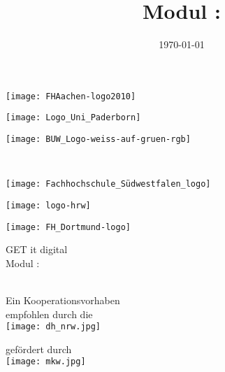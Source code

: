 \documentclass[twoside, a4paper]{article}
\title{Modul \GetItDigitalModulnumber: \GetItDigitalModulname}
\author{}
\institute{GET it digital}
\date{\today}
\numberwithin{figure}{section}
\numberwithin{equation}{section}
\numberwithin{table}{section}
\begin{document}
\thispagestyle{empty}
\begin{center}

	\begin{minipage}[c][2cm][c]{0.3\textwidth}
		\texttt{[image: FHAachen-logo2010]}
	\end{minipage}
	\hfill
	\begin{minipage}[c][2cm][c]{0.3\textwidth}
		\texttt{[image: Logo\_Uni\_Paderborn]}
	\end{minipage}
	\hfill
	\begin{minipage}[c][2cm][c]{0.3\textwidth}
		\texttt{[image: BUW\_Logo-weiss-auf-gruen-rgb]}
	\end{minipage}
	\\
	\begin{minipage}[c][2cm][c]{0.3\textwidth}
		\texttt{[image: Fachhochschule\_Südwestfalen\_logo]}
	\end{minipage}
	\hfill
	\begin{minipage}[c][2cm][c]{0.3\textwidth}
		\texttt{[image: logo-hrw]}
	\end{minipage}
	\hfill
	\begin{minipage}[c][2cm][c]{0.3\textwidth}
		\begin{center}
			\texttt{[image: FH\_Dortmund-logo]}
		\end{center}
	\end{minipage}

	\vfill
	\vspace{23ex}
	{{\large GET it digital} \\[10ex]
		\large Modul \GetItDigitalModulnumber:\\[0.5ex]}
	{\huge \GetItDigitalModulname\\[20ex]}

	{\large
		\GetItDigitalAutoren
	}
\end{center}
\vfill

\begin{minipage}[t]{0.36\textwidth}
	Ein Kooperationsvorhaben \\
	empfohlen durch die\\[0.3cm]
	\texttt{[image: dh\_nrw.jpg]}
\end{minipage}
\hfill
\begin{minipage}[t]{0.5\textwidth}
	gefördert durch\\[1cm]
	\texttt{[image: mkw.jpg]}
\end{minipage}
\end{document}
